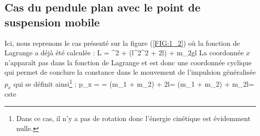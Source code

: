\subsection{Cas du pendule plan avec le point de suspension mobile}

Ici, nous reprenons le cas pr\'esent\'e sur la figure (\ref{FIG:1_2}) o\`u la fonction de Lagrange a d\'ej\`a \'et\'e calcul\'ee :
\benn
	L = ^{2} + \left(l^{2}\dot{\varphi}^{2} + 2l\cos\varphi{}\dot{\varphi}\right) + m_{2}gl\cos\varphi
\eenn
La coordonn\'ee $x$ n'appara\^it pas dans la fonction de Lagrange et est donc une coordonn\'ee cyclique qui permet de conclure la constance dans le mouvement de l'impulsion g\'en\'eralis\'ee $p_{x}$ qui se d\'efinit ainsi\footnote{Dans ce cas, il n'y a pas de rotation donc l'\'{e}nergie cin\'etique est \'evidemment nulle.} :
\benn
	p_{x} =  = (m_{1} + m_{2}) + 2l\dot{\varphi}\cos\varphi = (m_{1} + m_{2}) + m_{2}l\dot{\varphi}\cos\varphi = cste
\eenn

